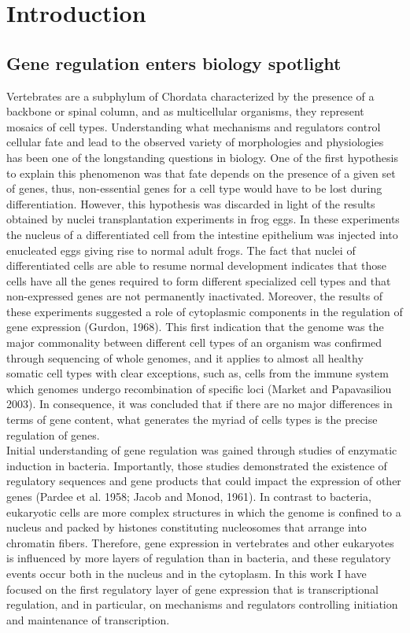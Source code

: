 \chapter{Introduction}

	\section{Gene regulation enters biology spotlight}

Vertebrates are a subphylum of Chordata characterized by the presence of a backbone or spinal column, and as multicellular organisms, they represent mosaics of cell types. Understanding what mechanisms and regulators control cellular fate and lead to the observed variety of morphologies and physiologies has been one of the longstanding questions in biology. One of the first hypothesis to explain this phenomenon was that fate depends on the presence of a given set of genes, thus, non-essential genes for a cell type would have to be lost during differentiation. However, this hypothesis was discarded in light of the results obtained by nuclei transplantation experiments in frog eggs. In these experiments the nucleus of a differentiated cell from the intestine epithelium was injected into enucleated eggs giving rise to normal adult frogs. The fact that nuclei of differentiated cells are able to resume normal development indicates that those cells have all the genes required to form different specialized cell types and that non-expressed genes are not permanently inactivated. Moreover, the results of these experiments suggested a role of cytoplasmic components in the regulation of gene expression (Gurdon, 1968). This first indication that the genome was the major commonality between different cell types of an organism was confirmed through sequencing of whole genomes, and it applies to almost all healthy somatic cell types with clear exceptions, such as, cells from the immune system which genomes undergo recombination of specific loci (Market and Papavasiliou 2003). In consequence, it was concluded that if there are no major differences in terms of gene content, what generates the myriad of cells types is the precise regulation of genes.\\

Initial understanding of gene regulation was gained through studies of enzymatic induction in bacteria. Importantly, those studies demonstrated the existence of regulatory sequences and gene products that could impact the expression of other genes (Pardee et al. 1958; Jacob and Monod, 1961). In contrast to bacteria, eukaryotic cells are more complex structures in which the genome is confined to a nucleus and packed by histones constituting nucleosomes that arrange into chromatin fibers. Therefore, gene expression in vertebrates and other eukaryotes is influenced by more layers of regulation than in bacteria, and these regulatory events occur both in the nucleus and in the cytoplasm. In this work I have focused on the first regulatory layer of gene expression that is transcriptional regulation, and in particular, on mechanisms and regulators controlling initiation and maintenance of transcription.\\

